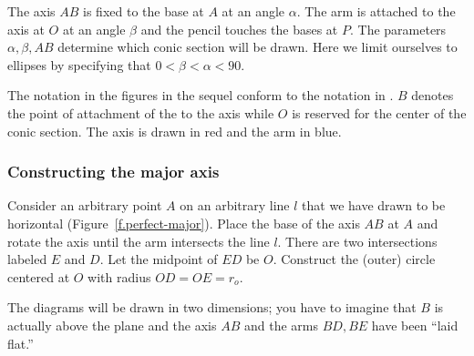 \documentclass[11pt,a4paper]{report}
\begin{document}



The axis $AB$ is fixed to the base at $A$ at an angle $\alpha$. The arm is attached to the axis at $O$ at an angle $\beta$ and the pencil touches the bases at $P$. The parameters $\alpha, \beta, AB$ determine which conic section will be drawn. Here we limit ourselves to ellipses by specifying that $0< \beta <\alpha< 90$. 

The notation in the figures in the sequel conform to the notation in \cite{henk}. $B$ denotes the point of attachment of the to the axis while $O$ is reserved for the center of the conic section. The axis is drawn in red and the arm in blue.


\subsubsection*{Constructing the major axis}


Consider an arbitrary point $A$ on an arbitrary line $l$ that we have drawn to be horizontal (Figure~\ref{f.perfect-major}). Place the base of the axis $AB$ at $A$ and rotate the axis until the arm intersects the line $l$. There are two intersections labeled $E$ and $D$. Let the midpoint of $ED$ be $O$. Construct the (outer) circle centered at $O$ with radius $OD=OE=r_o$.

The diagrams will be drawn in two dimensions; you have to imagine that $B$ is actually above the plane and the axis $AB$ and the arms $BD, BE$ have been ``laid flat.''

\end{document}
